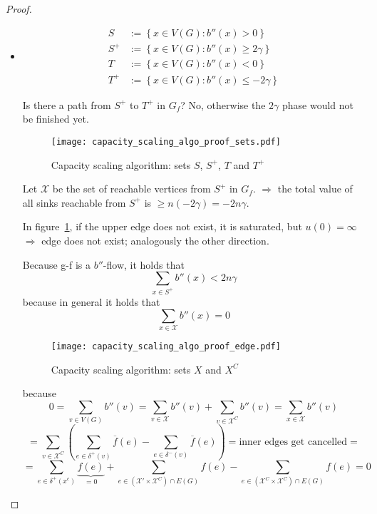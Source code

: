 \documentclass{article}
\newcommand{\set}[1]{\left\{#1\right\}}
\begin{document}
\begin{proof}
\begin{itemize}
    \item
      \begin{align*}
          S   &:= \set{x \in V(G): b''(x) > 0} \\
          S^+ &:= \set{x \in V(G): b''(x) \geq 2\gamma} \\
          T   &:= \set{x \in V(G): b''(x) < 0} \\
          T^+ &:= \set{x \in V(G): b''(x) \leq -2\gamma}
      \end{align*}

      Is there a path from $S^+$ to $T^+$ in $G_f$?
      No, otherwise the $2\gamma$ phase would not be finished yet.

      \begin{figure}[!h]
        \begin{center}
          \texttt{[image: capacity\_scaling\_algo\_proof\_sets.pdf]}
          \caption{Capacity scaling algorithm: sets $S$, $S^+$, $T$ and $T^+$}
        \end{center}
      \end{figure}

      Let $\mathcal{X}$ be the set of reachable vertices from $S^+$ in $G_f$.
      $\Rightarrow$ the total value of all sinks reachable from $S^+$ is
      $\geq n (-2\gamma) = -2n\gamma$.

      In figure~\ref{fig:csa-xc}, if the upper edge does not exist, it is saturated,
      but $u(0) = \infty$ $\Rightarrow$ edge does not exist; analogously the other direction.

      Because g-f is a $b''$-flow, it holds that
      \[ \sum_{x \in S^+} b''(x) < 2n\gamma \]
      because in general it holds that
      \[ \sum_{x \in \mathcal{X}} b''(x) = 0 \]

      \begin{figure}[!h]
        \begin{center}
          \texttt{[image: capacity\_scaling\_algo\_proof\_edge.pdf]}
          \caption{Capacity scaling algorithm: sets $X$ and $X^C$}
          \label{fig:csa-xc}
        \end{center}
      \end{figure}

      because
      \[
        0 = \sum_{v \in V(G)} b''(v)
          = \sum_{v \in \mathcal{X}} b''(v) + \sum_{v \in \mathcal{X}^C} b''(v)
          = \sum_{x \in \mathcal{X}} b''(v)
      \] \[
        = \sum_{v \in \mathcal{X}^C} \left(
          \sum_{e \in \delta^+(v)} \overline{f}(e) - \sum_{e \in \delta^-(v)} \overline{f}(e)
        \right)
        = \text{inner edges get cancelled} =
      \] \[
        = \sum_{e \in \delta^+(x^c)} \underbrace{f(e)}_{=0} + \sum_{e \in (\mathcal{X}' \times \mathcal{X}^C) \cap E(G)} f(e) - \sum_{e \in (\mathcal{X}^C \times \mathcal{X}^C) \cap E(G)} f(e) = 0
      \]


\end{itemize}
\end{proof}
\end{document}
